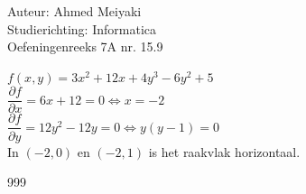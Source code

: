 \documentclass[a4paper]{article}
\begin{document}
  
\noindent \large Auteur: Ahmed Meiyaki \\
\noindent \large Studierichting: Informatica\\
\noindent \large Oefeningenreeks 7A nr. 15.9\\

\medskip


\normalsize

$f(x,y) = 3x^2 +12x + 4y^3 - 6y^2 + 5$\\

$\dfrac{\partial f}{\partial x} = 6x + 12 = 0 \Leftrightarrow x = -2 $\\

$\dfrac{\partial f}{\partial y} = 12y^2 - 12y = 0 \Leftrightarrow y\left(y-1\right) = 0 $\\

In $(-2,0)$ en $(-2,1)$ is het raakvlak horizontaal.








\begin{thebibliography}{999}
\end{thebibliography}
\end{document}
